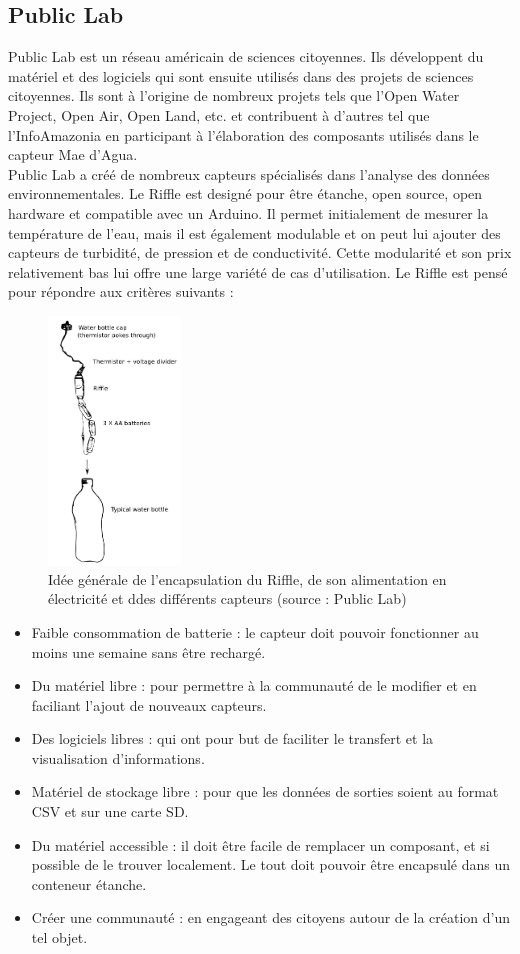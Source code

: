 \documentclass[10pt, article]{llncs}
\begin{document}
	\subsection{Public Lab}
		Public Lab est un réseau américain de sciences citoyennes. Ils développent du matériel et des logiciels qui sont ensuite utilisés dans des projets de sciences citoyennes. Ils sont à l'origine de nombreux projets tels que l'Open Water Project, Open Air, Open Land, etc. et contribuent à d'autres tel que l'InfoAmazonia en participant à l'élaboration des composants utilisés dans le capteur Mae d'Agua.\\
		Public Lab a créé de nombreux capteurs spécialisés dans l'analyse des données environnementales. Le Riffle est designé pour être étanche, open source, open hardware et compatible avec un Arduino. Il permet initialement de mesurer la température de l'eau, mais il est également modulable et on peut lui ajouter des capteurs de turbidité, de pression et de conductivité. Cette modularité et son prix relativement bas lui offre une large variété de cas d'utilisation. Le Riffle est pensé pour répondre aux critères suivants :
		\begin{figure}
			\begin{center}
				\includegraphics[width=100pt]{img/bottle_enclosure.png}
			\end{center}
			\caption{Idée générale de l'encapsulation du Riffle, de son alimentation en électricité et ddes différents capteurs (source : Public Lab)}
		\end{figure}
		\begin{itemize}
			\item Faible consommation de batterie : le capteur doit pouvoir fonctionner au moins une semaine sans être rechargé.
			\item Du matériel libre : pour permettre à la communauté de le modifier et en faciliant l'ajout de nouveaux capteurs.
			\item Des logiciels libres : qui ont pour but de faciliter le transfert et la visualisation d'informations.
			\item Matériel de stockage libre : pour que les données de sorties soient au format CSV et sur une carte SD.
			\item Du matériel accessible : il doit être facile de remplacer un composant, et si possible de le trouver localement. Le tout doit pouvoir être encapsulé dans un conteneur étanche.
			\item Créer une communauté : en engageant des citoyens autour de la création d'un tel objet.
		\end{itemize}
\end{document}
